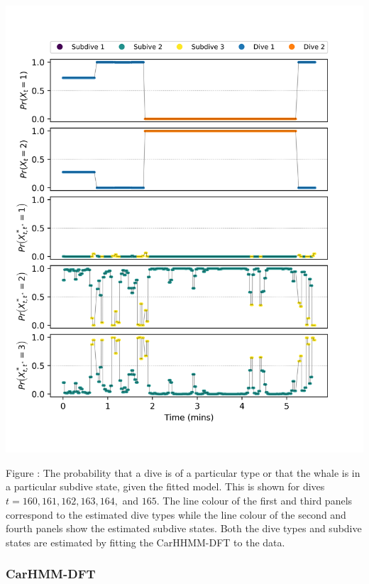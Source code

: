 \documentclass{article}
\begin{document}
        \begin{center}
        \includegraphics[width=6in]{../Plots/CarHHMM1_decoded_states.png}
        \end{center}
        
        \noindent Figure : The probability that a dive is of a particular type or that the whale is in a particular subdive state, given the fitted model. This is shown for dives $t = 160,161,162,163,164,$ and $165$. The line colour of the first and third panels correspond to the estimated dive types while the line colour of the second and fourth panels show the estimated subdive states. Both the dive types and subdive states are estimated by fitting the CarHHMM-DFT to the data.
        \addtocounter{fignum}{1}
        
        \subsubsection{CarHMM-DFT}
        
\end{document}
